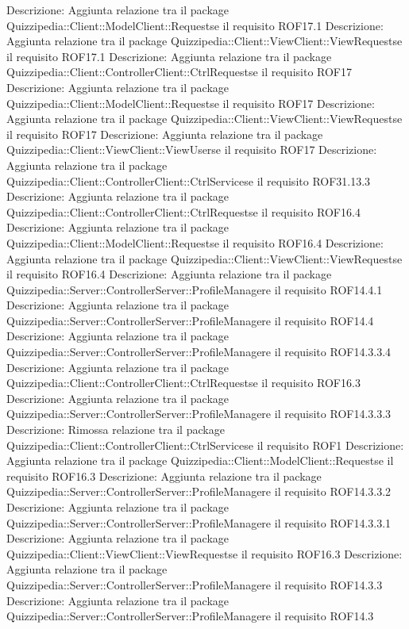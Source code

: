 Descrizione: Aggiunta relazione tra il package Quizzipedia::Client::ModelClient::Requestse il requisito ROF17.1 
Descrizione: Aggiunta relazione tra il package Quizzipedia::Client::ViewClient::ViewRequestse il requisito ROF17.1 
Descrizione: Aggiunta relazione tra il package Quizzipedia::Client::ControllerClient::CtrlRequestse il requisito ROF17 
Descrizione: Aggiunta relazione tra il package Quizzipedia::Client::ModelClient::Requestse il requisito ROF17 
Descrizione: Aggiunta relazione tra il package Quizzipedia::Client::ViewClient::ViewRequestse il requisito ROF17 
Descrizione: Aggiunta relazione tra il package Quizzipedia::Client::ViewClient::ViewUserse il requisito ROF17 
Descrizione: Aggiunta relazione tra il package Quizzipedia::Client::ControllerClient::CtrlServicese il requisito ROF31.13.3 
Descrizione: Aggiunta relazione tra il package Quizzipedia::Client::ControllerClient::CtrlRequestse il requisito ROF16.4 
Descrizione: Aggiunta relazione tra il package Quizzipedia::Client::ModelClient::Requestse il requisito ROF16.4 
Descrizione: Aggiunta relazione tra il package Quizzipedia::Client::ViewClient::ViewRequestse il requisito ROF16.4 
Descrizione: Aggiunta relazione tra il package Quizzipedia::Server::ControllerServer::ProfileManagere il requisito ROF14.4.1 
Descrizione: Aggiunta relazione tra il package Quizzipedia::Server::ControllerServer::ProfileManagere il requisito ROF14.4 
Descrizione: Aggiunta relazione tra il package Quizzipedia::Server::ControllerServer::ProfileManagere il requisito ROF14.3.3.4 
Descrizione: Aggiunta relazione tra il package Quizzipedia::Client::ControllerClient::CtrlRequestse il requisito ROF16.3 
Descrizione: Aggiunta relazione tra il package Quizzipedia::Server::ControllerServer::ProfileManagere il requisito ROF14.3.3.3 
Descrizione: Rimossa relazione tra il package Quizzipedia::Client::ControllerClient::CtrlServicese il requisito ROF1 
Descrizione: Aggiunta relazione tra il package Quizzipedia::Client::ModelClient::Requestse il requisito ROF16.3 
Descrizione: Aggiunta relazione tra il package Quizzipedia::Server::ControllerServer::ProfileManagere il requisito ROF14.3.3.2 
Descrizione: Aggiunta relazione tra il package Quizzipedia::Server::ControllerServer::ProfileManagere il requisito ROF14.3.3.1 
Descrizione: Aggiunta relazione tra il package Quizzipedia::Client::ViewClient::ViewRequestse il requisito ROF16.3 
Descrizione: Aggiunta relazione tra il package Quizzipedia::Server::ControllerServer::ProfileManagere il requisito ROF14.3.3 
Descrizione: Aggiunta relazione tra il package Quizzipedia::Server::ControllerServer::ProfileManagere il requisito ROF14.3 
